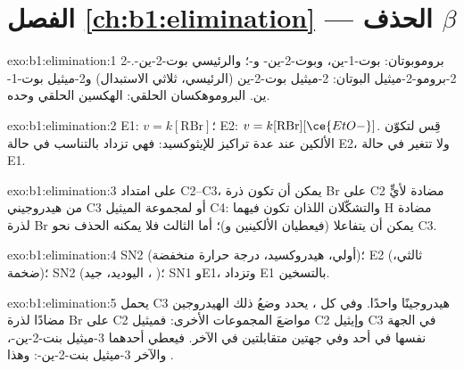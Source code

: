 \section*{الفصل \ref{ch:b1:elimination} --- الحذف \texorpdfstring{$\beta$}{بيتا}}

\begin{solution}{exo:b1:elimination:1}
2-بروموبوتان: بوت-1-ين، وبوت-2-ين- و-؛ والرئيسي
بوت-2-ين-. 2-برومو-2-ميثيل البوتان: 2-ميثيل بوت-2-ين (الرئيسي،
ثلاثي الاستبدال) و2-ميثيل بوت-1-ين. البروموهكسان الحلقي: الهكسين الحلقي وحده.
\end{solution}

\begin{solution}{exo:b1:elimination:2}
E1: $v = k[\mathrm{RBr}]$؛ E2: $v = k[\mathrm{RBr}][\ce{EtO-}]$. قِس
 لتكوّن الألكين عند عدة تراكيز للإيثوكسيد: فهي
تزداد بالتناسب في حالة E2، ولا تتغير في حالة E1.
\end{solution}

\begin{solution}{exo:b1:elimination:3}
على امتداد C2--C3، يمكن أن تكون ذرة Br على C2 مضادة لأيٍّ من هيدروجيني C3 أو
لمجموعة الميثيل C4: والتشكّلان اللذان تكون فيهما H مضادة لذرة Br يمكن أن
يتفاعلا  (فيعطيان الألكينين  و)؛ أما الثالث فلا يمكنه
الحذف نحو C3.
\end{solution}

\begin{solution}{exo:b1:elimination:4}
SN2 (أولي، هيدروكسيد، درجة حرارة منخفضة)؛ E2 (ثالثي، 
ضخمة)؛ SN2 (اليوديد،  جيد ، )؛
SN1 وE1، وتزداد E1 بالتسخين.
\end{solution}

\begin{solution}{exo:b1:elimination:5}
يحمل C3 هيدروجينًا واحدًا. وفي كل ، يحدد وضعُ ذلك الهيدروجين مضادًا
لذرة Br على C2 مواضعَ المجموعات الأخرى: فميثيل C2
وإيثيل C3 في الجهة نفسها في أحد  وفي
جهتين متقابلتين في الآخر. فيعطي أحدهما 3-ميثيل بنت-2-ين-، والآخر
3-ميثيل بنت-2-ين-: وهذا .
\end{solution}

